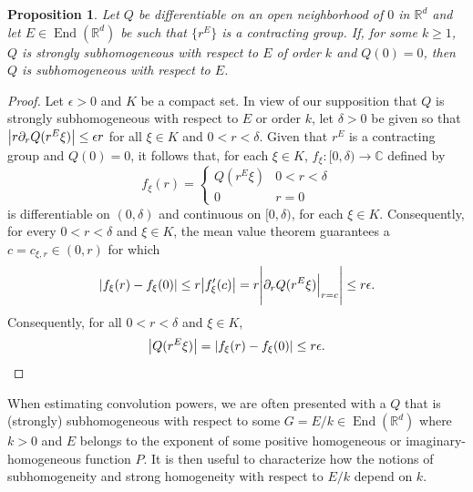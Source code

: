\documentclass[11pt, letter]{book}
\newtheorem{proposition}[theorem]{Proposition}
\newcommand\End{\operatorname{End}} %
\begin{document}
\begin{framed}
\begin{proposition}\label{prop:supersub_implies_sub}
Let $Q$ be differentiable on an open neighborhood of $0$ in $\mathbb{R}^d$ and let $E\in\End(\mathbb{R}^d)$ be such that $\{r^E\}$ is a contracting group. If, for some $k\geq 1$, $Q$ is strongly subhomogeneous with respect to $E$ of order $k$ and $Q(0)=0$, then $Q$ is subhomogeneous with respect to $E$.
\end{proposition}
\end{framed}
\begin{proof}
Let $\epsilon>0$ and $K$ be a compact set.  In view of our supposition that $Q$ is strongly subhomogeneous with respect to $E$ or order $k$, let $\delta>0$ be given so that $\abs{r\partial_r Q(r^E\xi)}\leq \epsilon r$ for all $\xi\in K$ and $0<r< \delta$. Given that $r^E$ is a contracting group and $Q(0)=0$, it follows that, for each $\xi\in K$, $f_{\xi}:[0,\delta)\to\mathbb{C}$ defined by
\begin{equation*}
f_{\xi}(r)=\begin{cases}
Q(r^E\xi) & 0<r<\delta\\
0 & r=0
\end{cases}
\end{equation*}
is differentiable on $(0,\delta)$ and continuous on $[0,\delta)$, for each $\xi\in K$. Consequently, for every $0<r<\delta$ and $\xi\in K$, the mean value theorem guarantees a $c=c_{\xi,r}\in (0,r)$ for which 
\begin{equation*}
\abs{f_{\xi}(r)-f_{\xi}(0)}\leq r\abs{f_{\xi}'(c)}=
r\Bigg\vert\partial_r Q(r^E\xi)\Big\vert_{r=c}\Bigg\vert\leq r\epsilon.
\end{equation*}
Consequently, for all $0<r<\delta$ and $\xi\in K$,
\begin{equation*}
\abs{Q(r^E\xi)}=\abs{f_{\xi}(r)-f_{\xi}(0)}\leq r\epsilon.
\end{equation*}
\end{proof}


\noindent  When estimating convolution powers, we are often presented with a $Q$ that is (strongly) subhomogeneous with respect to some $G = E/k \in \End{(\mathbb{R}^d)}$ where $k>0$ and $E$ belongs to the exponent of some positive homogeneous or imaginary-homogeneous function $P$. It is then useful to characterize how the notions of subhomogeneity and strong homogeneity with respect to $E/k$ depend on $k$.
\end{document}

